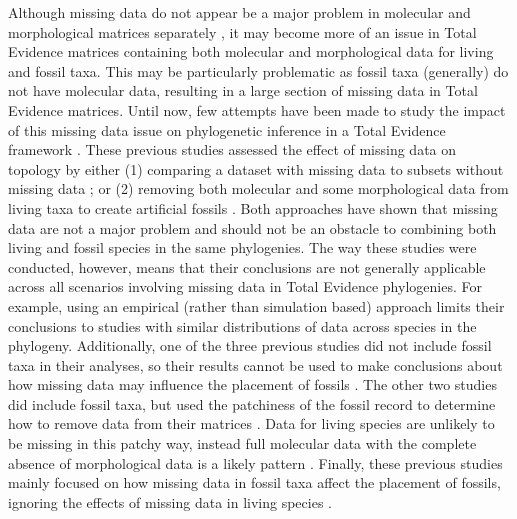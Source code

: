 Although missing data do not appear be a major problem in molecular and morphological matrices separately \citep[as long as enough data overlap in each case, and missing data are not phylogenetically biased;][]{wiensmissing2003,Wiens01102005,wiensmissing2006,wiensmissing2008,lemmonthe2009,Sanderson22072011,rouresite-specific2011,pattinsonphylogeny2014}, it may become more of an issue in Total Evidence matrices containing both molecular and morphological data for living and fossil taxa.
This may be particularly problematic as fossil taxa (generally) do not have molecular data, resulting in a large section of missing data in Total Evidence matrices.
Until now, few attempts have been made to study the impact of this missing data issue on phylogenetic inference in a Total Evidence framework \citep[i.e. using both molecular and morphological data;][]{Wiens01102005,manosphylogeny2007,pattinsonphylogeny2014}.
These previous studies assessed the effect of missing data on topology by either (1) comparing a dataset with missing data to subsets without missing data \citep{Wiens01102005}; or (2) removing both molecular and some morphological data from living taxa to create artificial fossils \citep{manosphylogeny2007,pattinsonphylogeny2014}.
Both approaches have shown that missing data are not a major problem and should not be an obstacle to combining both living and fossil species in the same phylogenies.
The way these studies were conducted, however, means that their conclusions are not generally applicable across all scenarios involving missing data in Total Evidence phylogenies.
For example, using an empirical (rather than simulation based) approach limits their conclusions to studies with similar distributions of data across species in the phylogeny.
Additionally, one of the three previous studies did not include fossil taxa in their analyses, so their results cannot be used to make conclusions about how missing data may influence the placement of fossils \citep{wiensmissing2003}. The other two studies did include fossil taxa, but used the patchiness of the fossil record to determine how to remove data from their matrices \citep{manosphylogeny2007,pattinsonphylogeny2014}. Data for living species are unlikely to be missing in this patchy way, instead full molecular data with the complete absence of morphological data is a likely pattern \citep{GuillermeCooperMissing}.
Finally, these previous studies mainly focused on how missing data in fossil taxa affect the placement of fossils, ignoring the effects of missing data in living species \citep{manosphylogeny2007,pattinsonphylogeny2014}.

